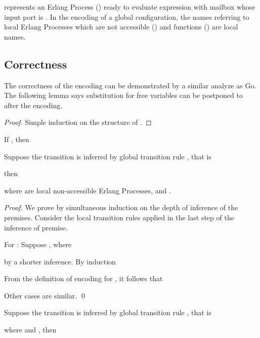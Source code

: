 \documentclass[runningheads, envcountsame, a4paper]{llncs}
\begin{document}
 represents an Erlang Process () ready to evaluate expression  with mailbox  whose input port is .
In the encoding of a global configuration, the names referring to local Erlang Processes
which are not accessible () and functions () are local names.




\subsection{Correctness}
The correctness of the encoding can be demonstrated by a similar analyze as Go.
The following lemma says substitution for free variables can be postponed to after the encoding.

\begin{lemma}
  
  \label{lem:cedelaysubs}
\end{lemma}
\begin{proof}
  Simple induction on the structure of .
\end{proof}

\begin{theorem}
  If , then 
  \label{thm:cesim}
\end{theorem}

\begin{proposition}
  Suppose the transition is inferred by global transition rule , that is
  
  then
  
  where  are local non-accessible Erlang Processes, and .
\end{proposition}
\begin{proof}
We prove by simultaneous induction on the depth of inference of the premises.
Consider the local transition rules applied in the last step of the inference of premise.

For : Suppose , where

by a shorter inference. By induction

From the definition of encoding for , it follows that


Other cases are similar. \qed
\end{proof}

\begin{proposition}
  Suppose the transition is inferred by global transition rule , that is
  
  where  and , then
  
\end{proposition}
\end{document}
